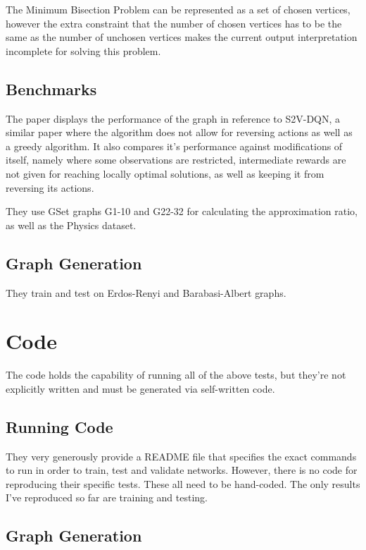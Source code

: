 \documentclass{article}
\begin{document}
The Minimum Bisection Problem can be represented as a set of chosen vertices, however the extra constraint that the number of chosen vertices has to be the same as the number of unchosen vertices makes the current output interpretation incomplete for solving this problem.

\subsection{Benchmarks}

The paper displays the performance of the graph in reference to S2V-DQN, a similar paper where the algorithm does not allow for reversing actions as well as a greedy algorithm. It also compares it's performance against modifications of itself, namely where some observations are restricted, intermediate rewards are not given for reaching locally optimal solutions, as well as keeping it from reversing its actions. 

They use GSet graphs G1-10 and G22-32 for calculating the approximation ratio, as well as the Physics dataset. 

\subsection{Graph Generation}

They train and test on Erdos-Renyi \cite{erdos} and Barabasi-Albert \cite{albert} graphs.

\section{Code}

The code holds the capability of running all of the above tests, but they're not explicitly written and must be generated via self-written code.

\subsection{Running Code}

They very generously provide a README file that specifies the exact commands to run in order to train, test and validate networks. However, there is no code for reproducing their specific tests. These all need to be hand-coded. The only results I've reproduced so far are training and testing.

\subsection{Graph Generation}
\end{document}
